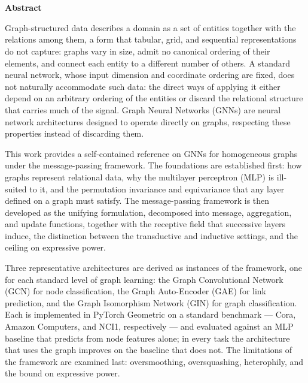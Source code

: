 \thispagestyle{plain}
\begin{fullwidth}
\begin{center}
    \LARGE
    \textcolor{itesodblue}{\textbf{\mytitle}}\\
    \Large
    \vspace{0.4cm}
    \textcolor{itesomblue}{\textbf{\myauthor}}\\
    \vspace{0.9cm}
    \textcolor{itesolblue}{\textbf{Abstract}}
\end{center}
Graph-structured data describes a domain as a set of entities together with the
relations among them, a form that tabular, grid, and sequential representations
do not capture: graphs vary in size, admit no canonical ordering of their
elements, and connect each entity to a different number of others. A standard
neural network, whose input dimension and coordinate ordering are
fixed, does not naturally accommodate such data: the direct ways of applying it
either depend on an arbitrary ordering of the entities or discard the
relational structure that carries much of the signal.
Graph Neural Networks (GNNs) are neural network
architectures designed to operate directly on graphs, respecting these
properties instead of discarding them.

This work provides a self-contained reference on GNNs for homogeneous graphs
under the message-passing framework. The foundations are established first: how
graphs represent relational data, why the multilayer perceptron (MLP) is ill-suited
to it, and the permutation invariance and equivariance that any layer defined on a
graph must satisfy. The message-passing framework is then developed as the
unifying formulation, decomposed into message, aggregation, and update
functions, together with the receptive field that successive layers induce, the
distinction between the transductive and inductive settings, and the ceiling on
expressive power.

Three representative architectures are derived as instances of the framework,
one for each standard level of graph learning: the Graph Convolutional Network (GCN) for
node classification, the Graph Auto-Encoder (GAE) for link prediction, and the
Graph Isomorphism Network (GIN) for graph classification. Each is implemented in
PyTorch Geometric on a standard benchmark --- Cora, Amazon Computers, and NCI1,
respectively --- and evaluated against an MLP baseline that predicts from node
features alone; in every task the architecture that uses the graph improves on
the baseline that does not. The limitations of the framework are examined last:
oversmoothing, oversquashing, heterophily, and the bound on expressive power.
\end{fullwidth}
